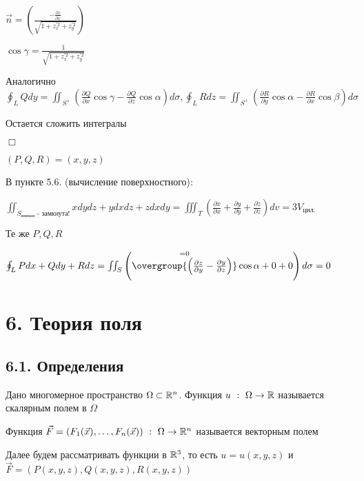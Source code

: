 \documentclass[12pt]{article}
\begin{document}
    $\overrightarrow{n} = \left(\frac{-\frac{\partial z}{\partial x}}{\sqrt{1 + z_x^{\prime 2} + z_y^{\prime 2}}}\right)$

    $\cos\gamma = \frac{1}{\sqrt{1 + z_x^{\prime 2} + z_y^{\prime 2}}}$

    Аналогично $\oint_L Qdy = \iint_{S^+} \left(\frac{\partial Q}{\partial x}\cos\gamma - \frac{\partial Q}{\partial z}\cos\alpha\right) d\sigma,
    \oint_L Rdz = \iint_{S^+} \left(\frac{\partial R}{\partial y}\cos\alpha - \frac{\partial R}{\partial x}\cos\beta\right) d\sigma$

    Остается сложить интегралы

    $\Box$

     $(P, Q, R) = (x, y, z)$

    В \Exs пункте 5.6. (вычисление поверхностного):

    $\iint_{S_{\text{внешн}} \text{ - замкнута!}} xdydz + ydxdz + zdxdy = \iiint_T \left(\frac{\partial x}{\partial x} + \frac{\partial y}{\partial y} + \frac{\partial z}{\partial z}\right) dv = 3V_{\text{цил.}}$

     Те же $P, Q, R$

    $\oint_L Pdx + Qdy + Rdz = \iint_{S} \left(\overset{= 0}{\overgroup{\left(\frac{\partial z}{\partial y} - \frac{\partial y}{\partial z}\right)}} \cos\alpha + 0 + 0\right) d\sigma = 0$

    \clearpage


    \section{6. Теория поля}

    \subsection{6.1. Определения}

    \hypertarget{scalarfield}{}

     Дано многомерное пространство $\Omega \subset \mathbb{R}^n$. Функция $u \ : \ \Omega \to \Real$ называется скалярным полем в $\Omega$

    \hypertarget{vectorfield}{}

     Функция $\vec{F} = (F_1(\vec{x}), \dots, F_n(\vec{x})) \ : \ \Omega \to \mathbb{R}^n$ называется векторным полем

    \Nota Далее будем рассматривать функции в $\mathbb{R}^3$, то есть $u = u(x, y, z)$ и $\vec{F} = (P(x, y, z), Q(x, y, z), R(x, y, z))$
\end{document}

